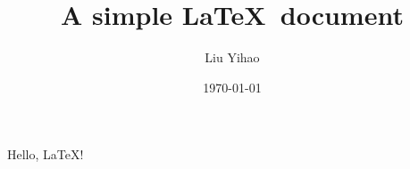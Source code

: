 \documentclass[a4paper]{article}
\title{A simple \LaTeX\ document}
\author{Liu Yihao}
\date{\today}
\begin{document}
	\maketitle
	Hello, \LaTeX !
\end{document}
